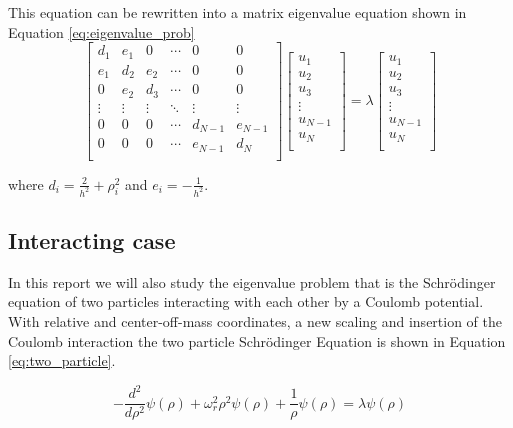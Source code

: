 This equation can be rewritten into a matrix eigenvalue equation shown in Equation \ref{eq:eigenvalue_prob}
\begin{equation}\label{eq:eigenvalue_prob}
\begin{bmatrix}
d_1 & e_1 & 0 & \cdots & 0 & 0\\
e_1 & d_2 & e_2 & \cdots & 0 & 0\\
0 & e_2 & d_3 & \cdots & 0 & 0\\
\vdots & \vdots & \vdots & \ddots & \vdots & \vdots\\
0 & 0 & 0 & \cdots & d_{N-1} & e_{N-1}\\
0 & 0 & 0 & \cdots & e_{N-1} & d_N\\
\end{bmatrix} \begin{bmatrix}
u_1 \\ u_2 \\ u_3 \\ \vdots \\ u_{N-1} \\ u_N \\ 
\end{bmatrix} = \lambda \begin{bmatrix}
u_1 \\ u_2 \\ u_3 \\ \vdots \\ u_{N-1} \\ u_N \\
\end{bmatrix}
\end{equation}

where $d_i = \frac{2}{h^2} + \rho_i^2$ and $e_i = -\frac{1}{h^2}$.

\subsection{Interacting case}

In this report we will also study the eigenvalue problem that is the Schrödinger equation of two particles interacting with each other by a Coulomb potential. With relative and center-off-mass coordinates, a new scaling and insertion of the Coulomb interaction the two particle Schrödinger Equation is shown in Equation \ref{eq:two_particle}.

\begin{equation}\label{eq:two_particle}
-\frac{d^2}{d\rho^2}\psi (\rho )+ \omega_r^2\rho^2\psi (\rho ) + \frac{1}{\rho}\psi (\rho ) = \lambda \psi (\rho )
\end{equation}

